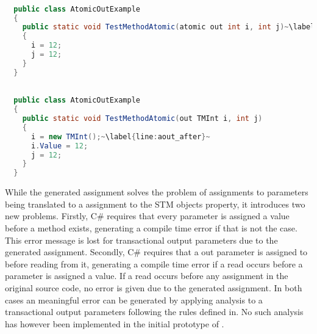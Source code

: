 \begin{lstlisting}[label=lst:before_atomic_out_parameter,
  caption={\bscode{atomic out} Parameter Before Transformation},
  language=Java,  
  showspaces=false,
  showtabs=false,
  breaklines=true,
  showstringspaces=false,
  breakatwhitespace=true,
  escapechar=~,
  commentstyle=\color{greencomments},
  keywordstyle=\color{bluekeywords},
  stringstyle=\color{redstrings},
  morekeywords={atomic, retry, orelse, var, get, set, ret, out}]  % Start your code-block

  public class AtomicOutExample
  {
    public static void TestMethodAtomic(atomic out int i, int j)~\label{line:aout_before}~
    {
      i = 12;
      j = 12;
    }
  }
\end{lstlisting}

\begin{lstlisting}[label=lst:after_atomic_out_parameter,
  caption={\bscode{atomic out} Parameter After Transformation},
  language=Java,  
  showspaces=false,
  showtabs=false,
  breaklines=true,
  showstringspaces=false,
  breakatwhitespace=true,
  escapechar=~,
  commentstyle=\color{greencomments},
  keywordstyle=\color{bluekeywords},
  stringstyle=\color{redstrings},
  morekeywords={atomic, retry, orelse, var, get, set, ret, out}]  % Start your code-block

  public class AtomicOutExample
  {
    public static void TestMethodAtomic(out TMInt i, int j)
    {
      i = new TMInt();~\label{line:aout_after}~
      i.Value = 12;
      j = 12;
    }
  }
\end{lstlisting}

While the generated assignment solves the problem of assignments to  parameters being translated to a assignment to the \ac{STM} objects  property, it introduces two new problems. Firstly, C\# requires that every  parameter is assigned a value before a method exists, generating a compile time error if that is not the case\cite[p. 94]{csharp2013specificaiton}. This error message is lost for transactional output parameters due to the generated assignment. Secondly, C\# requires that a out parameter is assigned to before reading from it\cite[p. 94]{csharp2013specificaiton}, generating a compile time error if a read occurs before a  parameter is assigned a value. If a read occurs before any assignment in the original source code, no error is given due to the generated assignment. In both cases an meaningful error can be generated by applying analysis to a transactional output parameters  following the rules defined in\cite[p. 95]{csharp2013specificaiton}. No such analysis has however been implemented in the initial prototype of \stmname.


